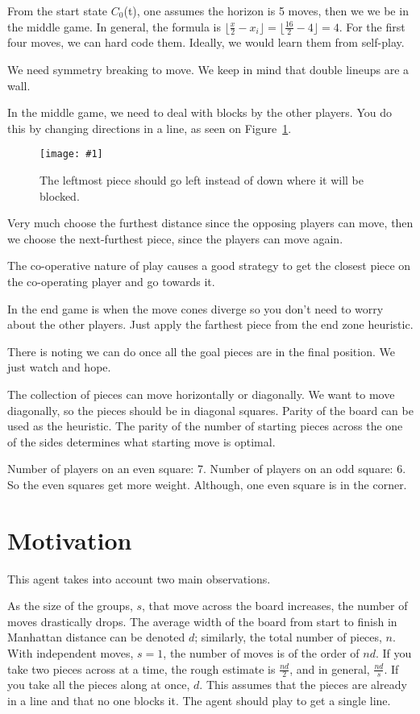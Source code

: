 \documentclass[twocolumn]{article}
\def\fig#1#2{\begin{figure}[!ht]\begin{center}
\texttt{[image: \#1]}
\end{center}\caption{#2}\label{#1}\end{figure}}
\begin{document}
From the start state $C_{0}$(t), one assumes the horizon is 5 moves, then we we be in the middle game. In general, the formula is $\lfloor\frac{x}{2} - x_{i}\rfloor = \lfloor\frac{16}{2} - 4\rfloor = 4$.
For the first four moves, we can hard code them. Ideally, we would learn them from self-play.

We need symmetry breaking to move. We keep in mind that double lineups are a wall.

In the middle game, we need to deal with blocks by the other players.
You do this by changing directions in a line, as seen on Figure~\ref{corners.jpg}.

\fig{corners.jpg}{The leftmost piece should go left instead of down where it will be blocked.}

Very much choose the furthest distance since the opposing players can move, then we choose the next-furthest piece, since the players can move again.

The co-operative nature of play causes a good strategy to get the closest piece on the co-operating player and go towards it.

In the end game is when the move cones diverge so you don't need to worry about the other players. Just apply the farthest piece from the end zone heuristic.

There is noting we can do once all the goal pieces are in the final position. We just watch and hope.


The collection of pieces can move horizontally or diagonally. We want to move diagonally, so the pieces should be in diagonal squares. Parity of the board can be used as the heuristic.
The parity of the number of starting pieces across the one of the sides determines what starting move is optimal.

Number of players on an even square: 7. Number of players on an odd square: 6. So the even squares get more weight. Although, one even square is in the corner.

\section{Motivation}


This agent takes into account two main observations.

As the size of the groups, $s$, that move across the board increases, the number of moves drastically drops. The average width of the board from start to finish in Manhattan distance can be denoted $d$; similarly, the total number of pieces, $n$. With independent moves, $s = 1$, the number of moves is of the order of $nd$. If you take two pieces across at a time, the rough estimate is $\frac{nd}{2}$, and in general, $\frac{nd}{s}$. If you take all the pieces along at once, $d$. This assumes that the pieces are already in a line and that no one blocks it.
The agent should play to get a single line.
\end{document}
